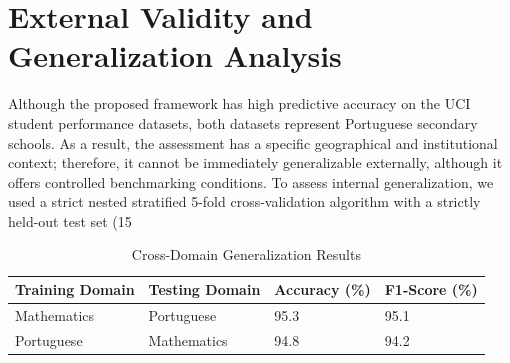 \documentclass[twocolumn]{svjour3}
\begin{document}
\section{External Validity and Generalization Analysis}
Although the proposed framework has high predictive accuracy on the UCI student performance datasets, both datasets represent Portuguese secondary schools. As a result, the assessment has a specific geographical and institutional context; therefore, it cannot be immediately generalizable externally, although it offers controlled benchmarking conditions. To assess internal generalization, we used a strict nested stratified 5-fold cross-validation algorithm with a strictly held-out test set (15%
\begin{table}[h]
\centering
\caption{Cross-Domain Generalization Results}
\label{tab:table16}
\begin{tabular}{lll}
\hline
Training Domain & Testing Domain & Accuracy (\%) & F1-Score (\%) \\
\hline
Mathematics & Portuguese & 95.3 & 95.1 \\
Portuguese & Mathematics & 94.8 & 94.2 \\
\hline
\end{tabular}
\end{table}
\end{document}
